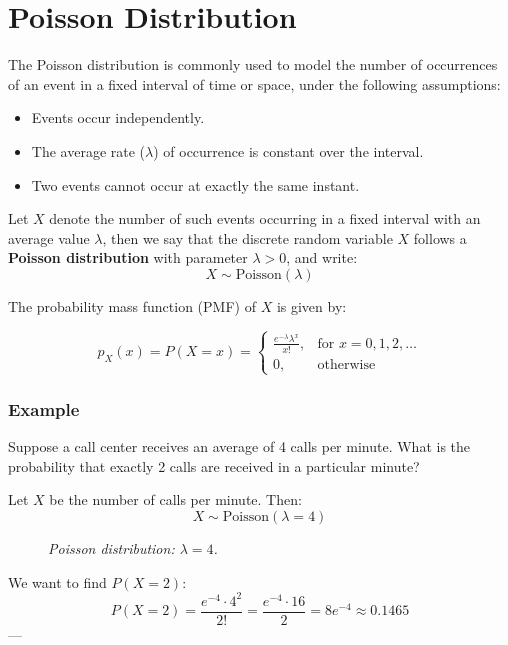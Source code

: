 \documentclass[twoside]{book}
\begin{document}
\section{Poisson Distribution}

The {Poisson distribution} is commonly used to model the number of occurrences of an event in a fixed interval of time or space, under the following assumptions:
\begin{itemize}
    \item Events occur independently.
    \item The average rate ($\lambda$) of occurrence is constant over the interval.
    \item Two events cannot occur at exactly the same instant.
\end{itemize}

Let $X$ denote the number of such events occurring in a fixed interval with an average value $\lambda$, then we say that the discrete random variable $X$ follows a \textbf{Poisson distribution} with parameter $\lambda > 0$, and write:
\[
X \sim \text{Poisson}(\lambda)
\]

The probability mass function (PMF) of $X$ is given by:
\begin{textbox}
\[
p_X(x) = P(X = x) =
\begin{cases}
\displaystyle \frac{e^{-\lambda} \lambda^x}{x!}, & \text{for } x = 0, 1, 2, \ldots \\
0, & \text{otherwise}
\end{cases}
\]
\end{textbox}

\subsubsection{Example}
Suppose a call center receives an average of 4 calls per minute. What is the probability that exactly 2 calls are received in a particular minute?

Let $X$ be the number of calls per minute. Then:
\[
X \sim \text{Poisson}(\lambda = 4)
\]

\begin{figure}[H]
\begin{center}
\caption{\textit{Poisson distribution: $\lambda = 4$.}}
\end{center}
\end{figure}
We want to find $P(X = 2)$:
\[
P(X = 2) = \frac{e^{-4} \cdot 4^2}{2!} = \frac{e^{-4} \cdot 16}{2} = 8e^{-4} \approx 0.1465
\]
---
\end{document}
